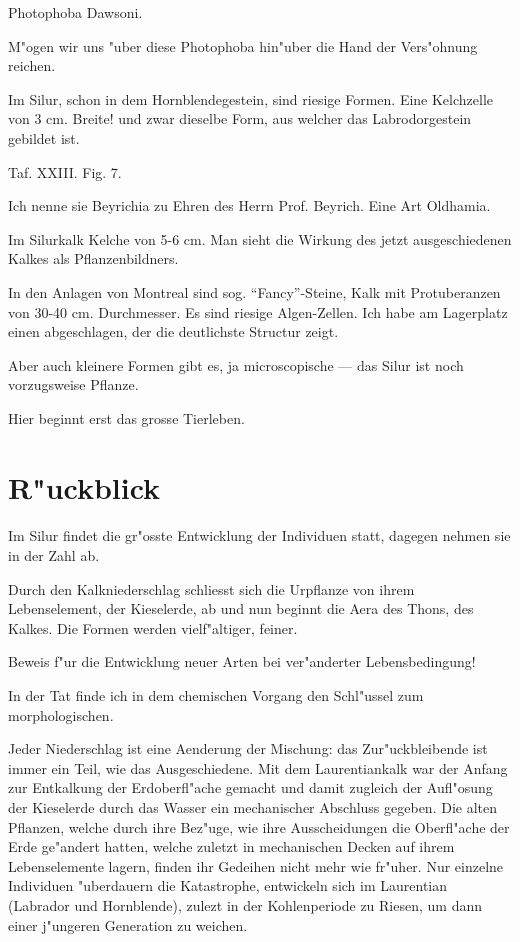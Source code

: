 \documentclass[a4paper, 11pt, oneside, german]{article}
\begin{document}
Photophoba Dawsoni.

M"ogen wir uns "uber diese Photophoba hin"uber die Hand der Vers"ohnung reichen.

Im Silur, schon in dem Hornblendegestein, sind riesige Formen. Eine Kelchzelle von 3 cm. Breite! und zwar dieselbe Form, aus welcher das Labrodorgestein gebildet ist.

Taf. XXIII. Fig. 7.

Ich nenne sie Beyrichia zu Ehren des Herrn Prof. Beyrich. Eine Art Oldhamia.

Im Silurkalk Kelche von 5-6 cm. Man sieht die Wirkung des jetzt ausgeschiedenen Kalkes als Pflanzenbildners.

In den Anlagen von Montreal sind sog. "`Fancy"'-Steine, Kalk mit Protuberanzen von 30-40 cm. Durchmesser. Es sind riesige Algen-Zellen. Ich habe am Lagerplatz einen abgeschlagen, der die deutlichste Structur zeigt.

Aber auch kleinere Formen gibt es, ja microscopische --- das Silur ist noch vorzugsweise Pflanze.

Hier beginnt erst das grosse Tierleben.
\clearpage
\section{R"uckblick}
\paragraph{}
Im Silur findet die gr"osste Entwicklung der Individuen statt, dagegen nehmen sie in der Zahl ab.

Durch den Kalkniederschlag schliesst sich die Urpflanze von ihrem Lebenselement, der Kieselerde, ab und nun beginnt die Aera des Thons, des Kalkes. Die Formen werden vielf"altiger, feiner.

Beweis f"ur die Entwicklung neuer Arten bei ver"anderter Lebensbedingung!

In der Tat finde ich in dem chemischen Vorgang den Schl"ussel zum morphologischen.

Jeder Niederschlag ist eine Aenderung der Mischung: das Zur"uckbleibende ist immer ein Teil, wie das Ausgeschiedene. Mit dem Laurentiankalk war der Anfang zur Entkalkung der Erdoberfl"ache gemacht und damit zugleich der Aufl"osung der Kieselerde durch das Wasser ein mechanischer Abschluss gegeben. Die alten Pflanzen, welche durch ihre Bez"uge, wie ihre Ausscheidungen die Oberfl"ache der Erde ge"andert hatten, welche zuletzt in mechanischen Decken auf ihrem Lebenselemente lagern, finden ihr Gedeihen nicht mehr wie fr"uher. Nur einzelne Individuen "uberdauern die Katastrophe, entwickeln sich im Laurentian (Labrador und Hornblende), zulezt in der Kohlenperiode zu Riesen, um dann einer j"ungeren Generation zu weichen.
\end{document}
